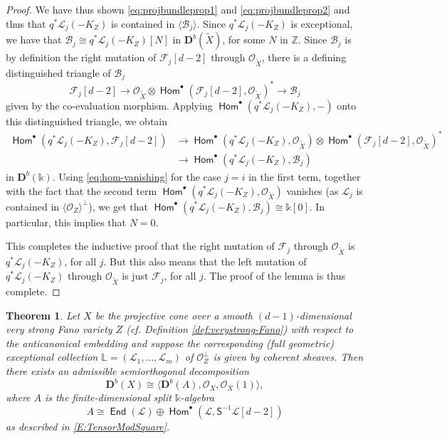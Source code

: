 \documentclass[a4paper,11pt, reqno]{amsart}
\def\L{\mathbb L}
\def\Z{\mathbb Z}
\def\DD{\mathbf D}
\def\OO{\mathcal O}
\def\sB{\mathscr{B}}
\def\sF{\mathscr{F}}
\def\sL{\mathscr{L}}
\newcommand{\opname}[1]{\operatorname{\mathsf{#1}}}
\newcommand{\Hom}{\opname{Hom}}
\newcommand{\End}{\opname{End}}
\def\Db{\DD^b}
\newcommand{\bS}{\mathsf{S}}
\theoremstyle{plain}
\newtheorem{theorem}[dummy]{Theorem}
\theoremstyle{definition}
\numberwithin{equation}{section}
\begin{document}
\begin{proof}
We have thus shown \eqref{eq:projbundleprop1} and \eqref{eq:projbundleprop2} and thus that $q^\ast\sL_j (-K_Z) $ is contained in $\langle \sB_j\rangle $.
Since $q^\ast\sL_j (-K_Z) $ is exceptional, we have that $\sB_{j} \cong q^\ast\sL_j (-K_Z) [N]$ in $\Db(\tilde{X})$, for some $N$ in $\Z$.
    Since $\sB_{j}$ is by definition the right mutation of $\sF_{j}[d-2]$ through $\OO_{\tilde{X}}$, there is a defining distinguished triangle of $\sB_{j}$
    \[
    \sF_{j}[d-2] \to \OO_{\tilde{X}} \otimes \Hom^\bullet ( \sF_{j}[d-2] , \OO_{\tilde{X}} )^\ast \to \sB_{j} 
    \]
    given by the co-evaluation morphism.
    Applying $\Hom^\bullet ( q^\ast\sL_j (-K_Z) , - )$ onto this distinguished triangle, we obtain
    \begin{align*}
        \Hom^\bullet ( q^\ast\sL_j (-K_Z) ,\sF_{j}[d-2] ) & 
        \to \Hom^\bullet ( q^\ast\sL_j (-K_Z) , \OO_{\tilde{X}} ) \otimes \Hom^\bullet ( \sF_{j}[d-2] , \OO_{\tilde{X}} )^\ast \\
        &\to \Hom^\bullet ( q^\ast\sL_j (-K_Z) , \sB_{j} )
    \end{align*}
    in $\Db(\mathbb{k})$.
    Using \eqref{eq:hom-vanishing} for the case $j=i$ in the first term, together with the fact that the second term $\Hom^\bullet ( q^\ast\sL_j (-K_Z) , \OO_{\tilde{X}} )$ vanishes (as $\sL_j$ is contained in $\langle\OO_Z\rangle^\perp$), we get that $\Hom^\bullet ( q^\ast\sL_j (-K_Z) , \sB_{j}  ) \cong \mathbb{k}[0]$.
    In particular, this implies that $N=0$.

This completes the inductive proof
        that the right mutation of $\sF_{j}$ through $\OO_{\tilde{X}}$ is $q^\ast\sL_j (-K_Z)$, for all $j$.
    But this also means that the left mutation of $q^\ast\sL_j (-K_Z)$ through $\OO_{\tilde{X}}$ is just $\sF_{j}$, for all $j$.
    The proof of the lemma is thus complete.
\end{proof}


\begin{theorem}\label{thm:projcone-split}
    Let $X$ be the projective cone over a smooth $(d-1)$-dimensional very strong Fano variety $Z$ (cf. Definition \ref{def:verystrong-Fano}) with respect to the anticanonical embedding and suppose the corresponding (full geometric) exceptional collection $\L  = ( \sL_1 , \ldots , \sL_m ) $ of $\OO_Z^\perp $ 
    is given by coherent sheaves.
    Then there exists an admissible semiorthogonal decomposition 
    \begin{equation}\label{eq:porjconesod}
        \Db (X) \cong \langle \Db ( A  ) , \OO_X , \OO_X (1) \rangle , 
    \end{equation}
    where 
    $A $ is the finite-dimensional split $\mathbb{k}$-algebra 
    \[
A \cong  \End ( \sL  ) \oplus  \Hom^\bullet ( \sL , \bS^{-1} \sL [d-2] ) 
    \]
    as described in \eqref{E:TensorModSquare}.
\end{theorem}
\end{document}
